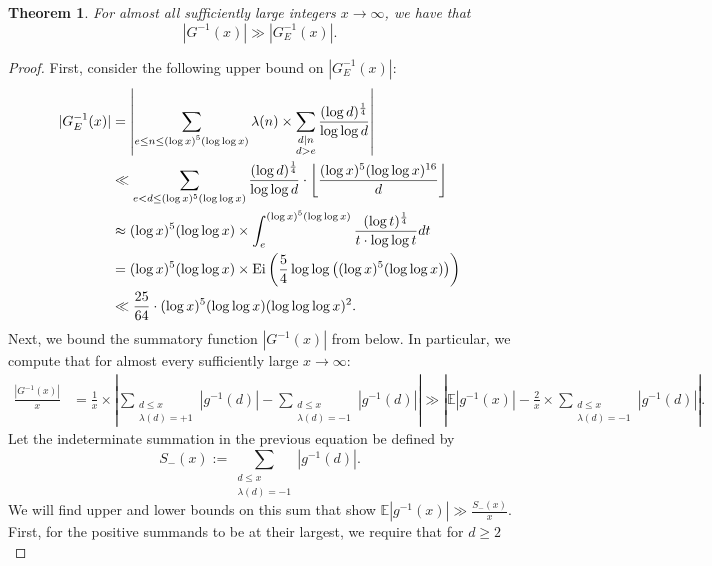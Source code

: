 \documentclass[11pt,reqno,a4letter]{article}
\numberwithin{figure}{section}
\numberwithin{table}{section}
\newcommand{\Floor}[2]{\ensuremath{\left\lfloor \frac{#1}{#2} \right\rfloor}}
\theoremstyle{plain}
\newtheorem{theorem}{Theorem}
\numberwithin{theorem}{section}
\theoremstyle{definition}
\begin{document}
\begin{theorem} 
\label{theorem_GInvxLowerBoundByGEInvx_v1} 
For almost all sufficiently large integers $x \rightarrow \infty$, we have that 
\[
|G^{-1}(x)| \gg |G_E^{-1}(x)|. 
\]
\end{theorem} 
\begin{proof} 
First, consider the following upper bound on $|G_E^{-1}(x)|$: 
\begin{align} 
\notag 
|G_E^{-1}(x)| & = \left\lvert \sum_{\substack{e \leq n \leq (\log x)^{5} (\log\log x)}} \lambda(n) \times 
     \sum_{\substack{d|n \\ d > e}} \frac{(\log d)^{\frac{1}{4}}}{\log\log d} 
     \right\rvert \\ 
\notag 
     & \ll \sum_{e < d \leq (\log x)^{5} (\log\log x)} \frac{(\log d)^{\frac{1}{4}}}{\log\log d} \cdot 
     \Floor{(\log x)^{5} (\log\log x)^{16}}{d} \\ 
\notag 
     & \approx (\log x)^{5} (\log\log x) \times 
     \int_{e}^{(\log x)^{5} (\log\log x)} \frac{(\log t)^{\frac{1}{4}}}{t \cdot \log\log t} dt \\ 
\notag 
     & = (\log x)^{5} (\log\log x) \times 
     \operatorname{Ei}\left(\frac{5}{4} \log\log\left((\log x)^{5} (\log\log x)\right)\right) \\ 
\label{eqn_proof_tag_AbsGEInvx_AsymptoticUpperBound_v1} 
     & \ll \frac{25}{64} \cdot (\log x)^{5} (\log\log x) (\log\log\log x)^2. 
\end{align} 
Next, we bound the summatory function $|G^{-1}(x)|$ from below. 
In particular, we compute that for almost every sufficiently large $x \rightarrow \infty$: 
\begin{align*} 
\frac{|G^{-1}(x)|}{x} & = \frac{1}{x} \times \left\lvert 
     \sum_{\substack{d \leq x \\ \lambda(d)=+1}} |g^{-1}(d)| - 
     \sum_{\substack{d \leq x \\ \lambda(d)=-1}} |g^{-1}(d)| 
     \right\rvert 
     \gg \left\lvert 
     \mathbb{E}|g^{-1}(x)| - \frac{2}{x} \times \sum_{\substack{d \leq x \\ \lambda(d)=-1}} |g^{-1}(d)| 
     \right\rvert. 
\end{align*} 
Let the indeterminate summation in the previous equation be defined by 
\[
S_{-}(x) := \sum_{\substack{d \leq x \\ \lambda(d)=-1}} |g^{-1}(d)|. 
\]
We will find upper and lower bounds on this sum that show $\mathbb{E}|g^{-1}(x)| \gg \frac{S_{-}(x)}{x}$. 
First, for the positive summands to be at their largest, we require that for $d \geq 2$ 

\end{proof}
\end{document}
